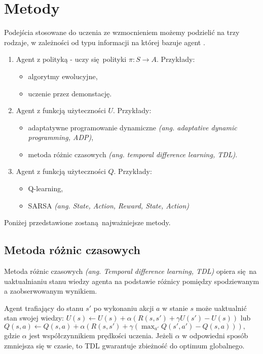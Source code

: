 \section{Metody}\label{methods}

Podejścia stosowane do uczenia ze wzmocnieniem możemy podzielić na trzy rodzaje, w zależności od typu informacji na której bazuje agent \cite{Russell:2009:AIM:1671238}.

\begin{enumerate}
\item Agent z polityką - uczy się polityki  $\pi: S \rightarrow A$. Przykłady:
\begin{itemize}
\item algorytmy ewolucyjne,
\item uczenie przez demonstację.
\end{itemize}
\item Agent z funkcją użyteczności $U$. Przykłady:
\begin{itemize}
\item adaptatywne programowanie dynamiczne \textit{(ang. adaptative dynamic programming, ADP)},
\item metoda różnic czasowych \textit{(ang. temporal difference learning, TDL)}.
\end{itemize}
\item Agent z funkcją użyteczności $Q$. Przykłady:
\begin{itemize}
\item Q-learning,
\item SARSA \textit{(ang. State, Action, Reward, State, Action)}
\end{itemize}
\end{enumerate}

Poniżej przedstawione zostaną najważniejsze metody.

\subsection{Metoda różnic czasowych}\label{tdl}

Metoda różnic czasowych \textit{(ang. Temporal difference learning, TDL)} \cite{Sutton:1988:LPM:637912.637937} opiera się na uaktualnianiu stanu wiedzy agenta na podstawie różnicy pomiędzy spodziewanym a zaobserwowanym wynikiem.

Agent trafiający do stanu $s'$ po wykonaniu akcji $a$ w stanie $s$ może uaktualnić stan swojej wiedzy: $U(s) \leftarrow U(s) + \alpha (R(s,s') + \gamma U(s') - U (s))$ lub $Q(s,a) \leftarrow Q(s,a) + \alpha (R(s,s') + \gamma (\max_{a'}Q(s',a') - Q (s,a))),$ gdzie $\alpha$ jest współczynnikiem prędkości uczenia. Jeżeli $\alpha$ w odpowiedni sposób zmniejsza się w czasie, to TDL gwarantuje zbieżność do optimum globalnego.


